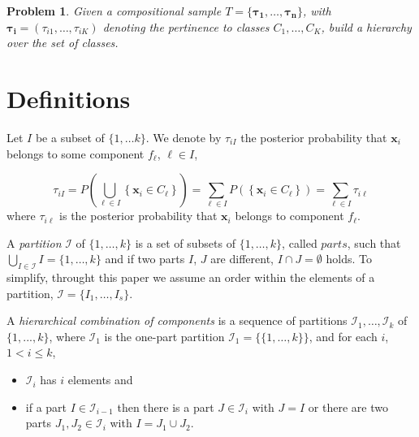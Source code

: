 \documentclass[10pt, a4paper]{article}
\newtheorem{prob}{Problem}
\begin{document}
\begin{prob}
Given a compositional sample $T = \{ \boldsymbol{\tau_1}, \dots, \boldsymbol{\tau_n} \}$, with $\boldsymbol{\tau_i} = (\tau_{i1}, \dots, \tau_{iK})$ denoting the pertinence to classes $C_1, \dots, C_K$, build a hierarchy over the set of classes.
\end{prob}

\section{Definitions}
\label{definitions}

Let $I$ be a subset of $\{1, \dots k\}$. We denote by $\tau_{i I}$ the posterior probability that $\textbf{x}_i$ belongs to some component $f_\ell$, $\ell \in I$,

\begin{equation}
\tau_{i I} = P( \bigcup_{\ell \in I}  \left\{ \textbf{x}_i \in C_\ell \right\}) = \sum_{\ell \in I} P( \left\{ \textbf{x}_i \in C_\ell \right\}) = \sum_{\ell \in I} \tau_{i \ell}
\end{equation}
where $\tau_{i \ell}$ is the posterior probability that $\textbf{x}_i$ belongs to component $f_\ell$.


A \emph{partition} $\mathcal{I}$ of $\{1, \dots, k\}$ is a set of subsets of $\{1, \dots, k\}$, called $parts$, such that $\bigcup_{I \in \mathcal{I}} I = \{1, \dots, k\}$ and  if two parts $I$, $J$ are different, $I \cap J = \emptyset$ holds. To simplify, throught this paper we assume an order within the elements of a partition, $\mathcal{I} = \{ I_1, \dots, I_s\}$.


A \emph{hierarchical combination of components} is a sequence of partitions $\mathcal{I}_1, \dots, \mathcal{I}_k$ of $\{1,...,k\}$, where $\mathcal{I}_1$ is the one-part partition $\mathcal{I}_1 = \{ \{1, \dots, k\} \}$, and for each $i$, $1 <  i \leq k$,

\begin{itemize}
\item $\mathcal{I}_i$ has $i$ elements  and
\item if a part $I \in \mathcal{I}_{i-1}$ then there is a part $J \in \mathcal{I}_i$ with $J = I$ or there are two parts $J_1, J_2 \in \mathcal{I}_i$ with $I = J_1 \cup J_2$.
\end{itemize}
\end{document}
